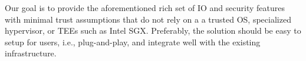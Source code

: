 
Our goal is to provide the aforementioned rich set of IO and security features with minimal trust assumptions that do not rely on a a trusted OS, specialized hypervisor, or TEEs such as Intel SGX. Preferably, the solution should be easy to setup for users, i.e., plug-and-play, and integrate well with the existing infrastructure.  
